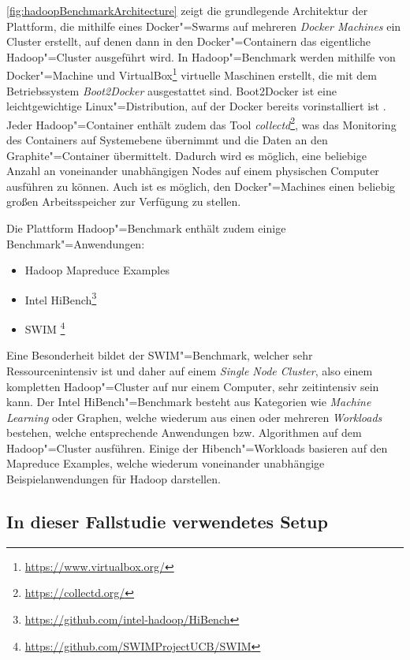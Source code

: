 \autoref{fig:hadoopBenchmarkArchitecture} zeigt die grundlegende Architektur der Plattform, die mithilfe eines Docker"=Swarms auf mehreren \emph{Docker Machines} ein Cluster erstellt, auf denen dann in den Docker"=Containern das eigentliche Hadoop"=Cluster ausgeführt wird.
In Hadoop"=Benchmark werden mithilfe von Docker"=Machine und VirtualBox\footnote{\url{https://www.virtualbox.org/}} virtuelle Maschinen erstellt, die mit dem  Betriebssystem \emph{Boot2Docker} ausgestattet sind.
Boot2Docker ist eine leichtgewichtige Linux"=Distribution, auf der Docker bereits vorinstalliert ist \cite{DockerMachineGettingStartedVm}.
Jeder Hadoop"=Container enthält zudem das Tool \emph{collectd}\footnote{\url{https://collectd.org/}}, was das Monitoring des Containers auf Systemebene übernimmt und die Daten an den Graphite"=Container übermittelt.
Dadurch wird es möglich, eine beliebige Anzahl an voneinander unabhängigen Nodes auf einem physischen Computer ausführen zu können.
Auch ist es möglich, den Docker"=Machines einen beliebig großen Arbeitsspeicher zur Verfügung zu stellen.

Die Plattform Hadoop"=Benchmark enthält zudem einige Benchmark"=Anwendungen:

\begin{itemize}
    \item Hadoop Mapreduce Examples
    \item Intel HiBench\footnote{\url{https://github.com/intel-hadoop/HiBench}}
    \item \ac{SWIM} \footnote{\url{https://github.com/SWIMProjectUCB/SWIM}}
\end{itemize}

Eine Besonderheit bildet der SWIM"=Benchmark, welcher sehr Ressourcenintensiv ist und daher auf einem \emph{Single Node Cluster}, also einem kompletten Hadoop"=Cluster auf nur einem Computer, sehr zeitintensiv sein kann.
Der Intel HiBench"=Benchmark besteht aus Kategorien wie \emph{Machine Learning} oder Graphen, welche wiederum aus einen oder mehreren \emph{Workloads} bestehen, welche entsprechende Anwendungen bzw. Algorithmen auf dem Hadoop"=Cluster ausführen.
Einige der Hibench"=Workloads basieren auf den Mapreduce Examples, welche wiederum voneinander unabhängige Beispielanwendungen für Hadoop darstellen.

\subsection{In dieser Fallstudie verwendetes Setup}\label{sec:clusterFallstudie}

